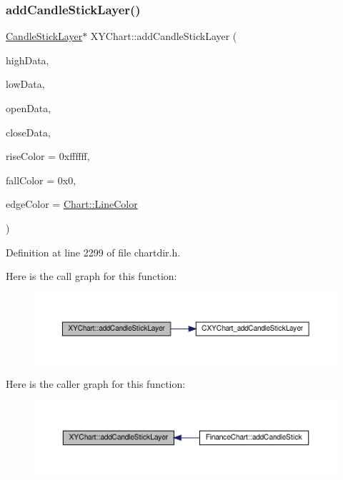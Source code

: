 \subsubsection{\texorpdfstring{add\+Candle\+Stick\+Layer()}{addCandleStickLayer()}}
{\footnotesize\ttfamily \hyperlink{class_candle_stick_layer}{Candle\+Stick\+Layer}$\ast$ X\+Y\+Chart\+::add\+Candle\+Stick\+Layer (\begin{DoxyParamCaption}\item[{\hyperlink{class_double_array}{Double\+Array}}]{high\+Data,  }\item[{\hyperlink{class_double_array}{Double\+Array}}]{low\+Data,  }\item[{\hyperlink{class_double_array}{Double\+Array}}]{open\+Data,  }\item[{\hyperlink{class_double_array}{Double\+Array}}]{close\+Data,  }\item[{int}]{rise\+Color = {\ttfamily 0xffffff},  }\item[{int}]{fall\+Color = {\ttfamily 0x0},  }\item[{int}]{edge\+Color = {\ttfamily \hyperlink{namespace_chart_abee0d882fdc9ad0b001245ad9fc64011a04817a359476e87a5c572a7a69cdaaec}{Chart\+::\+Line\+Color}} }\end{DoxyParamCaption})\hspace{0.3cm}{\ttfamily [inline]}}



Definition at line 2299 of file chartdir.\+h.

Here is the call graph for this function\+:
\nopagebreak
\begin{figure}[H]
\begin{center}
\leavevmode
\includegraphics[width=350pt]{class_x_y_chart_ae6ebf6d55fae7f770f8d54ba52c5265c_cgraph}
\end{center}
\end{figure}
Here is the caller graph for this function\+:
\nopagebreak
\begin{figure}[H]
\begin{center}
\leavevmode
\includegraphics[width=350pt]{class_x_y_chart_ae6ebf6d55fae7f770f8d54ba52c5265c_icgraph}
\end{center}
\end{figure}
\mbox{\label{class_x_y_chart_a43cb04a6549ac473640df206e3a8b20f}} 
